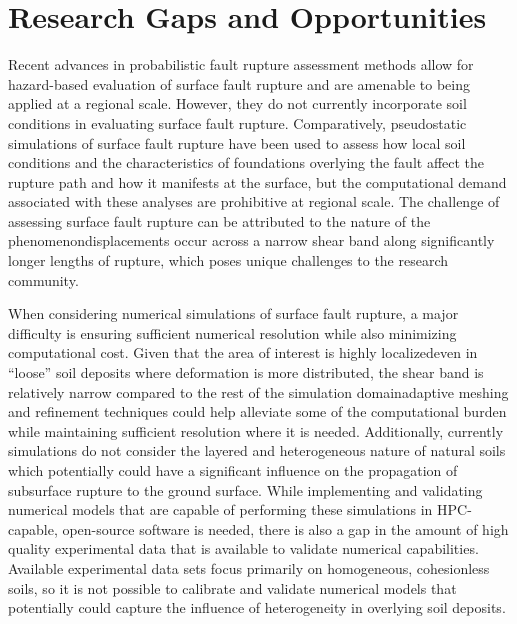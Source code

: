 \section{Research Gaps and Opportunities}
\label{sec:eq_surface_rup_research_gaps}
Recent advances in probabilistic fault rupture assessment methods allow for hazard-based evaluation of surface fault rupture and are amenable to being applied at a regional scale. However, they do not currently incorporate soil conditions in evaluating surface fault rupture. Comparatively, pseudostatic simulations of surface fault rupture have been used to assess how local soil conditions and the characteristics of foundations overlying the fault affect the rupture path and how it manifests at the surface, but the computational demand associated with these analyses are prohibitive at regional scale. The challenge of assessing surface fault rupture can be attributed to the nature of the phenomenon\textemdash displacements occur across a narrow shear band along significantly longer lengths of rupture, which poses unique challenges to the research community.


When considering numerical simulations of surface fault rupture, a major difficulty is ensuring sufficient numerical resolution while also minimizing computational cost. Given that the area of interest is highly localized\textemdash even in ``loose'' soil deposits where deformation is more distributed, the shear band is relatively narrow compared to the rest of the simulation domain\textemdash adaptive meshing and refinement techniques could help alleviate some of the computational burden while maintaining sufficient resolution where it is needed. Additionally, currently simulations do not consider the layered and heterogeneous nature of natural soils which potentially could have a significant influence on the propagation of subsurface rupture to the ground surface. While implementing and validating numerical models that are capable of performing these simulations in HPC-capable, open-source software is needed, there is also a gap in the amount of high quality experimental data that is available to validate numerical capabilities. Available experimental data sets focus primarily on homogeneous, cohesionless soils, so it is not possible to calibrate and validate numerical models that potentially could capture the influence of heterogeneity in overlying soil deposits.

